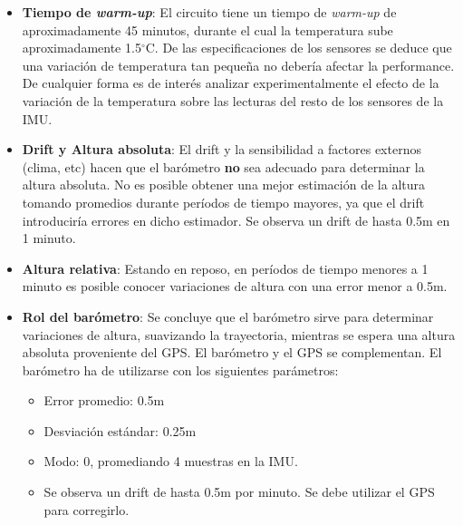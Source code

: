 \documentclass[main]{subfiles}
\newcommand{\degc}{$^\circ$C}
\begin{document}
\begin{itemize}
\item \textbf{Tiempo de \textit{warm-up}}: El circuito tiene un tiempo de \textit{warm-up} de aproximadamente 45 minutos, durante el cual la temperatura sube aproximadamente 1.5\degc. De las especificaciones de los sensores se deduce que una variaci\'on de temperatura tan peque\~na no deber\'ia afectar la performance. De cualquier forma es de inter\'es analizar experimentalmente el efecto de la variaci\'on de la temperatura sobre las lecturas del resto de los sensores de la IMU.
\item \textbf{Drift y Altura absoluta}: El drift y la sensibilidad a factores externos (clima, etc) hacen que el bar\'ometro \textbf{no} sea adecuado para determinar la altura absoluta. No es posible obtener una mejor estimaci\'on de la altura tomando promedios durante per\'iodos de tiempo mayores, ya que el drift introducir\'ia errores en dicho estimador. Se observa un drift de hasta 0.5m en 1 minuto.
\item \textbf{Altura relativa}: Estando en reposo, en per\'iodos de tiempo menores a 1 minuto es posible conocer variaciones de altura con una error menor a 0.5m.
\item \textbf{Rol del bar\'ometro}: Se concluye que el bar\'ometro sirve para determinar variaciones de altura, suavizando la trayectoria, mientras se espera una altura absoluta proveniente del GPS. El bar\'ometro y el GPS se complementan. El bar\'ometro ha de utilizarse con los siguientes par\'ametros:
  \begin{itemize}
  \item Error promedio: 0.5m
  \item Desviaci\'on est\'andar: 0.25m
  \item Modo: 0, promediando 4 muestras en la IMU.
  \item Se observa un drift de hasta 0.5m por minuto. Se debe utilizar el GPS para corregirlo.
  \end{itemize}
\end{itemize}
\end{document}
